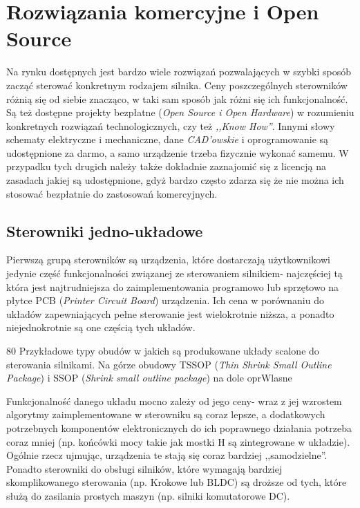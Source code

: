 \section{Rozwiązania komercyjne i Open Source}
\label{s:sterowniki}

Na rynku dostępnych jest bardzo wiele rozwiązań pozwalających w szybki sposób zacząć sterować konkretnym rodzajem silnika. Ceny poszczególnych sterowników różnią się od siebie znacząco, w taki sam sposób jak różni się ich funkcjonalność. Są też dostępne projekty bezpłatne ({\it Open Source i Open Hardware}) w rozumieniu konkretnych rozwiązań technologicznych, czy też {\it ,,Know How''}. Innymi słowy schematy elektryczne i mechaniczne, dane {\it CAD'owskie} i oprogramowanie są udostępnione za darmo, a samo urządzenie trzeba fizycznie wykonać samemu. W przypadku tych drugich należy także dokładnie zaznajomić się z licencją na zasadach jakiej są udostępnione, gdyż bardzo często zdarza się że nie można ich stosować bezpłatnie do zastosowań komercyjnych. 

\subsection{Sterowniki jedno-układowe}

Pierwszą grupą sterowników są urządzenia, które dostarczają użytkownikowi jedynie część funkcjonalności związanej ze sterowaniem silnikiem- najczęściej tą która jest najtrudniejsza do zaimplementowania programowo lub sprzętowo na płytce PCB ({\it Printer Circuit Board}) urządzenia. Ich cena w porównaniu do układów zapewniających pełne sterowanie jest wielokrotnie niższa, a ponadto niejednokrotnie są one częścią tych układów. 

	{80}
	{Przykładowe typy obudów w jakich są produkowane układy scalone do sterowania silnikami. Na górze obudowy TSSOP ({\it Thin Shrink Small Outline Package}) i SSOP ({\it Shrink small outline package}) na dole}
	{oprWlasne}

Funkcjonalność danego układu mocno zależy od jego ceny- wraz z jej wzrostem algorytmy zaimplementowane w sterowniku są coraz lepsze, a dodatkowych potrzebnych komponentów elektronicznych do ich poprawnego działania potrzeba coraz mniej (np. końcówki mocy takie jak mostki H są zintegrowane w układzie). Ogólnie rzecz ujmując, urządzenia te stają się coraz bardziej ,,samodzielne''. Ponadto sterowniki do obsługi silników, które wymagają bardziej skomplikowanego sterowania (np. Krokowe lub BLDC) są droższe od tych, które służą do zasilania prostych maszyn (np. silniki komutatorowe DC). 

